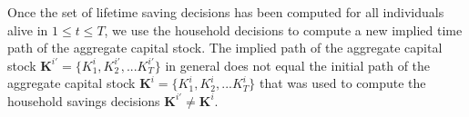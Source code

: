 \documentclass[letterpaper,12pt]{article}
\theoremstyle{definition}
\begin{document}

  Once the set of lifetime saving decisions has been computed for all individuals alive in $1\leq t\leq T$, we use the household decisions to compute a new implied time path of the aggregate capital stock. The implied path of the aggregate capital stock $\bm{K}^{i'}=\{K_1^i,K_2^{i'},...K_T^{i'}\}$ in general does not equal the initial path of the aggregate capital stock $\bm{K}^{i}=\{K_1^i,K_2^{i},...K_T^{i}\}$ that was used to compute the household savings decisions $\bm{K}^{i'}\neq\bm{K}^i$.
\end{document}
